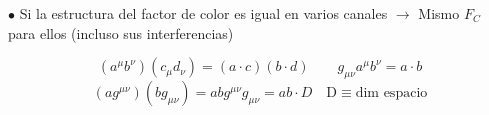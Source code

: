 $\bullet$ Si la estructura del factor de color es igual en varios canales $\rightarrow$ Mismo $F_C$ para ellos (incluso sus interferencias)





\vspace{2pt}

$$(a^\mu b^\nu)(c_\mu d_\nu) = (a\cdot c) (b\cdot d ) \qquad g_{\mu \nu} a^\mu b^\nu = a\cdot b$$
$$(a g^{\mu\nu})(bg_{\mu\nu}) =ab g^{\mu \nu}g_{\mu \nu} =a b \cdot D\quad \text{D}\equiv\text{dim espacio}$$ 


\begin{center}
    



\end{center}

\vfill

\vspace{2pt}



